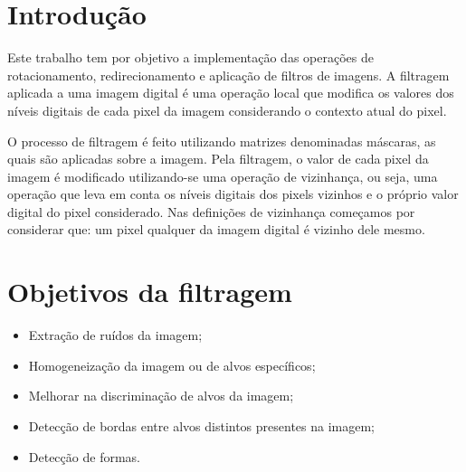 \newpage
\section{Introdução}
Este trabalho tem por objetivo a implementação das operações de rotacionamento, redirecionamento e aplicação de filtros de imagens. A filtragem aplicada a uma imagem digital é uma operação local que modifica os valores dos níveis digitais de cada pixel da imagem considerando o contexto atual do pixel.

O processo de filtragem é feito utilizando matrizes denominadas máscaras, as quais são aplicadas sobre a imagem. Pela filtragem, o valor de cada pixel da imagem é modificado utilizando-se uma operação de vizinhança, ou seja, uma operação que leva em conta os níveis digitais dos pixels vizinhos e o próprio valor digital do pixel considerado. Nas definições de vizinhança começamos por considerar que: um pixel qualquer da imagem digital é vizinho dele mesmo.


\section{Objetivos da filtragem}
\begin{itemize}
	\item Extração de ruídos da imagem;
	\item Homogeneização da imagem ou de alvos específicos;
	\item Melhorar na discriminação de alvos da imagem;
	\item Detecção de bordas entre alvos distintos presentes na imagem;
	\item Detecção de formas.
\end{itemize}